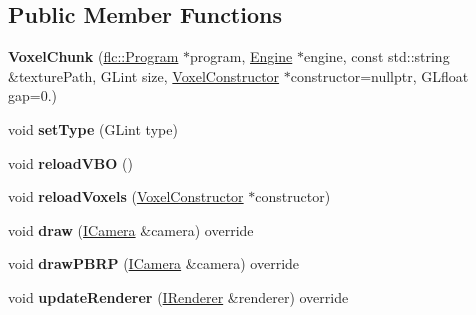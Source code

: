 \subsection*{Public Member Functions}
\begin{DoxyCompactItemize}
\item 
{\bfseries Voxel\+Chunk} (\hyperlink{classflw_1_1flc_1_1Program}{flc\+::\+Program} $\ast$program, \hyperlink{classflw_1_1Engine}{Engine} $\ast$engine, const std\+::string \&texture\+Path, G\+Lint size, \hyperlink{classflw_1_1flf_1_1VoxelConstructor}{Voxel\+Constructor} $\ast$constructor=nullptr, G\+Lfloat gap=0.)\hypertarget{classflw_1_1flf_1_1VoxelChunk_a0bfa0da98e8545a7ca325f80efebf473}{}\label{classflw_1_1flf_1_1VoxelChunk_a0bfa0da98e8545a7ca325f80efebf473}

\item 
void {\bfseries set\+Type} (G\+Lint type)\hypertarget{classflw_1_1flf_1_1VoxelChunk_aed73af0ac1484a5390b42601b3c869be}{}\label{classflw_1_1flf_1_1VoxelChunk_aed73af0ac1484a5390b42601b3c869be}

\item 
void {\bfseries reload\+V\+BO} ()\hypertarget{classflw_1_1flf_1_1VoxelChunk_a1af997eab931244f7387fcf961e7a9ed}{}\label{classflw_1_1flf_1_1VoxelChunk_a1af997eab931244f7387fcf961e7a9ed}

\item 
void {\bfseries reload\+Voxels} (\hyperlink{classflw_1_1flf_1_1VoxelConstructor}{Voxel\+Constructor} $\ast$constructor)\hypertarget{classflw_1_1flf_1_1VoxelChunk_a369bdf2852ddf649a5732bf197391ed2}{}\label{classflw_1_1flf_1_1VoxelChunk_a369bdf2852ddf649a5732bf197391ed2}

\item 
void {\bfseries draw} (\hyperlink{classflw_1_1flf_1_1ICamera}{I\+Camera} \&camera) override\hypertarget{classflw_1_1flf_1_1VoxelChunk_a6378fa9aabff73ae9ce0a8cfa31dd29f}{}\label{classflw_1_1flf_1_1VoxelChunk_a6378fa9aabff73ae9ce0a8cfa31dd29f}

\item 
void {\bfseries draw\+P\+B\+RP} (\hyperlink{classflw_1_1flf_1_1ICamera}{I\+Camera} \&camera) override\hypertarget{classflw_1_1flf_1_1VoxelChunk_a74caf1ee59229bd42aecd5e547806b26}{}\label{classflw_1_1flf_1_1VoxelChunk_a74caf1ee59229bd42aecd5e547806b26}

\item 
void {\bfseries update\+Renderer} (\hyperlink{classflw_1_1flf_1_1IRenderer}{I\+Renderer} \&renderer) override\hypertarget{classflw_1_1flf_1_1VoxelChunk_a838a8d066f2c549b02df8d4ce5e74453}{}\label{classflw_1_1flf_1_1VoxelChunk_a838a8d066f2c549b02df8d4ce5e74453}


\end{DoxyCompactItemize}
